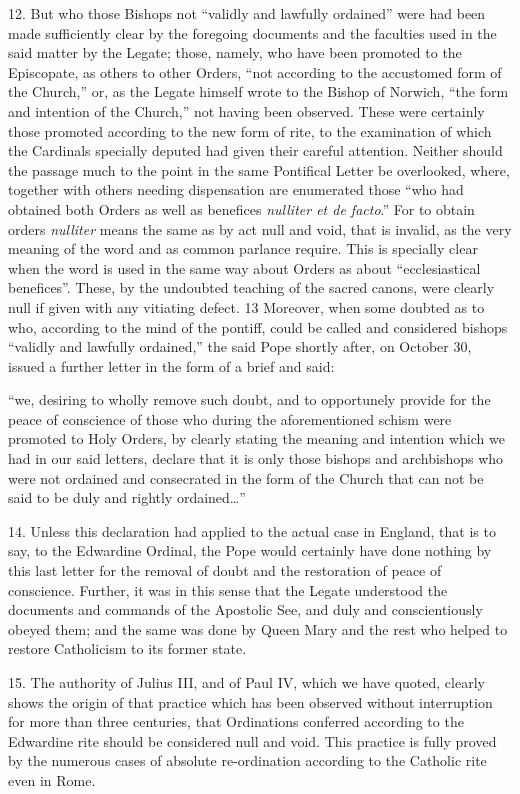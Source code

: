 12. But who those Bishops not ``validly and lawfully ordained'' were had
been made sufficiently clear by the foregoing documents and the
faculties used in the said matter by the Legate; those, namely, who have
been promoted to the Episcopate, as others to other Orders, ``not
according to the accustomed form of the Church,'' or, as the Legate
himself wrote to the Bishop of Norwich, ``the form and intention of the
Church,'' not having been observed. These were certainly those promoted
according to the new form of rite, to the examination of which the
Cardinals specially deputed had given their careful attention. Neither
should the passage much to the point in the same Pontifical Letter be
overlooked, where, together with others needing dispensation are
enumerated those ``who had obtained both Orders as well as benefices
\emph{nulliter et de facto}.'' For to obtain orders \emph{nulliter}
means the same as by act null and void, that is invalid, as the very
meaning of the word and as common parlance require. This is specially
clear when the word is used in the same way about Orders as about
``ecclesiastical benefices''. These, by the undoubted teaching of the
sacred canons, were clearly null if given with any vitiating defect. 13
Moreover, when some doubted as to who, according to the mind of the
pontiff, could be called and considered bishops ``validly and lawfully
ordained,'' the said Pope shortly after, on October 30, issued a further
letter in the form of a brief and said:

``we, desiring to wholly remove such doubt, and to opportunely provide
for the peace of conscience of those who during the aforementioned
schism were promoted to Holy Orders, by clearly stating the meaning and
intention which we had in our said letters, declare that it is only
those bishops and archbishops who were not ordained and consecrated in
the form of the Church that can not be said to be duly and rightly
ordained\ldots''

14. Unless this declaration had applied to the actual case in England,
that is to say, to the Edwardine Ordinal, the Pope would certainly have
done nothing by this last letter for the removal of doubt and the
restoration of peace of conscience. Further, it was in this sense that
the Legate understood the documents and commands of the Apostolic See,
and duly and conscientiously obeyed them; and the same was done by Queen
Mary and the rest who helped to restore Catholicism to its former state.

15. The authority of Julius III, and of Paul IV, which we have quoted,
clearly shows the origin of that practice which has been observed
without interruption for more than three centuries, that Ordinations
conferred according to the Edwardine rite should be considered null and
void. This practice is fully proved by the numerous cases of absolute
re-ordination according to the Catholic rite even in Rome.

